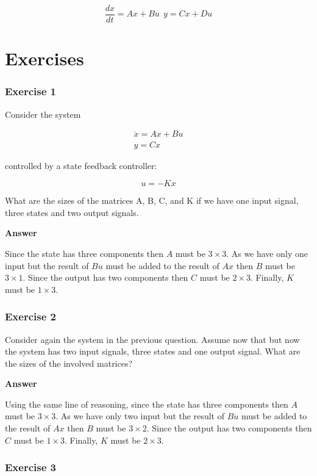 \begin{equation}
\frac{dx}{dt} = Ax + Bu ~~ y = Cx + Du
\end{equation}


\section{Exercises}

\subsubsection{Exercise 1}

Consider the system 

\begin{eqnarray}
\dot{x} = Ax + Bu \\
y = Cx 
\end{eqnarray}

controlled by a state feedback controller: 

\begin{equation}
 u = -Kx  
\end{equation}

What are  the sizes of the matrices A, B, C, and K if we have one input signal, three states and two output signals.

\textbf{Answer}

Since the state has three components then $A$ must be $3\times 3$. As we have only one input but the result of $Bu$ must be added to the result of $Ax$ then $B$ must be $3\times 1$.
Since the output has two components then $C$ must be $2\times 3$. Finally, $K$ must be $1\times 3$.

\subsubsection{Exercise 2}

Consider again the system in the previous  question. Assume now that but now the system has two input signals, three states and one output signal. What are the sizes of the involved matrices?

\textbf{Answer}

Using the same line of reasoning, since the state has three components then $A$ must be $3\times 3$. As we have only two input but the result of $Bu$ must be added to the result of $Ax$ then $B$ must be $3\times 2$. Since the output has two components then $C$ must be $1\times 3$. Finally, $K$ must be $2\times 3$.

\subsubsection{Exercise 3}

